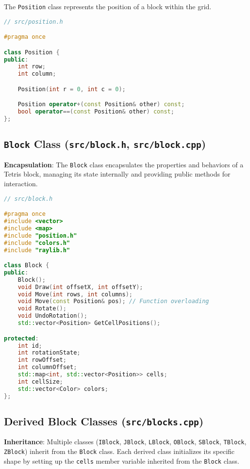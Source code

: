 \documentclass{article}
\begin{document}
The \texttt{Position} class represents the position of a block within the grid.

\begin{lstlisting}[language=C++]
// src/position.h

#pragma once

class Position {
public:
    int row;
    int column;

    Position(int r = 0, int c = 0);

    Position operator+(const Position& other) const;
    bool operator==(const Position& other) const;
};
\end{lstlisting}

\subsection{\texttt{Block} Class (\texttt{src/block.h}, \texttt{src/block.cpp})}

\textbf{Encapsulation}: The \texttt{Block} class encapsulates the properties and behaviors of a Tetris block, managing its state internally and providing public methods for interaction.

\begin{lstlisting}[language=C++]
// src/block.h

#pragma once
#include <vector>
#include <map>
#include "position.h"
#include "colors.h"
#include "raylib.h"

class Block {
public:
    Block();
    void Draw(int offsetX, int offsetY);
    void Move(int rows, int columns);
    void Move(const Position& pos); // Function overloading
    void Rotate();
    void UndoRotation();
    std::vector<Position> GetCellPositions();

protected:
    int id;
    int rotationState;
    int rowOffset;
    int columnOffset;
    std::map<int, std::vector<Position>> cells;
    int cellSize;
    std::vector<Color> colors;
};
\end{lstlisting}

\subsection{Derived Block Classes (\texttt{src/blocks.cpp})}

\textbf{Inheritance}: Multiple classes (\texttt{IBlock}, \texttt{JBlock}, \texttt{LBlock}, \texttt{OBlock}, \texttt{SBlock}, \texttt{TBlock}, \texttt{ZBlock}) inherit from the \texttt{Block} class. Each derived class initializes its specific shape by setting up the \texttt{cells} member variable inherited from the \texttt{Block} class.
\end{document}
